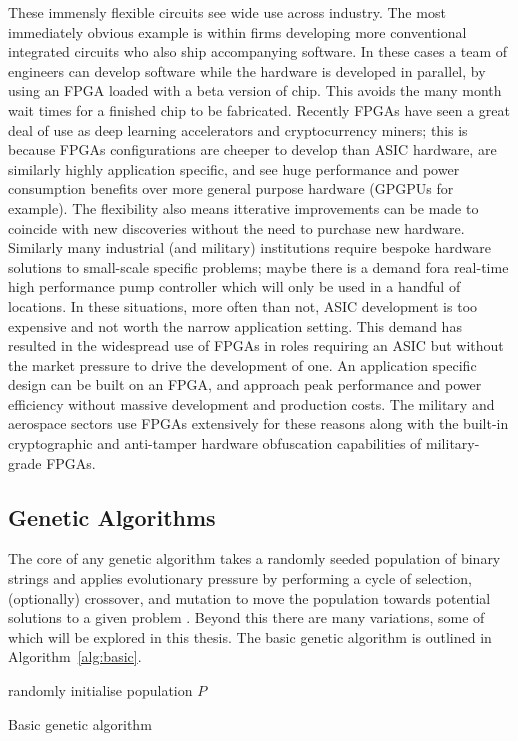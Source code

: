 These immensly flexible circuits see wide use across industry. The most immediately
obvious example is
within firms developing more conventional integrated circuits who also ship accompanying
software. In these cases a team of engineers can develop software
while the hardware is developed in parallel, by using an FPGA loaded with a beta version
of chip. This avoids the many month wait times for a finished chip to be fabricated.
Recently FPGAs have seen a great deal of use as deep learning accelerators and cryptocurrency
miners; this is because FPGAs
configurations are cheeper to develop than ASIC hardware, are similarly highly application specific,
and see huge performance and power consumption benefits over more general purpose
hardware (GPGPUs for example). The flexibility also means itterative improvements
can be made to coincide with new discoveries without the need to purchase new
hardware. Similarly many industrial (and military) institutions require
bespoke hardware solutions to small-scale specific problems; maybe there is a
demand fora real-time high performance
pump controller which will only be used in a handful of locations. In these situations,
more often than not, ASIC
development is too expensive and not worth the narrow application setting. This demand has resulted in
the widespread use of FPGAs
in roles requiring an ASIC but without the market pressure to drive the development
of one.
An application specific design can be built on an FPGA, and approach peak performance and power
efficiency without massive development and production costs.
The military and aerospace sectors use FPGAs extensively for these reasons along with
the built-in cryptographic and anti-tamper hardware obfuscation capabilities of
military-grade FPGAs.

\subsection{Genetic Algorithms}
The core of any genetic algorithm takes a randomly seeded population of binary strings
and applies
evolutionary pressure by performing a cycle of selection, (optionally) crossover, and mutation
to move the population towards potential solutions to a given problem \cite{Goldberg:1989:GAS:534133}.
Beyond this there are many
variations, some of which will be explored in this thesis. The basic genetic algorithm is
outlined in Algorithm~\ref{alg:basic}.

\begin{algorithm}[t]
	randomly initialise population $P$\;
	\caption{Basic genetic algorithm}
	\label{alg:basic}
\end{algorithm}

